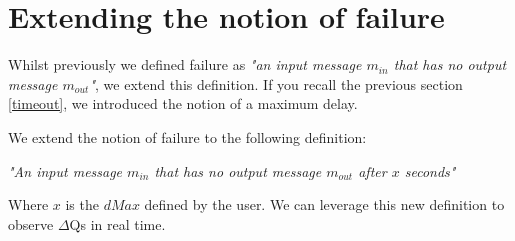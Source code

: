 \section{Extending the notion of failure}
    Whilst previously we defined failure as \textit{"an input message $m_{in}$ that has no output message $m_{out}$"}, we extend this definition. If you recall the previous section \ref{timeout}, we introduced the notion of a maximum delay.

    We extend the notion of failure to the following definition:
        \begin{center}
            \textit{"An input message $m_{in}$ that has no output message $m_{out}$ after $x$ seconds"}
        \end{center}
    Where $x$ is the $dMax$ defined by the user. We can leverage this new definition to observe $\Delta$Qs in real time.

